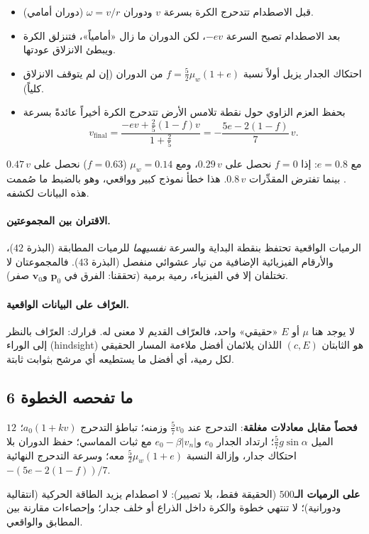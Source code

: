 \documentclass[11pt,a4paper]{article}
\newcommand{\en}[1]{\textenglish{#1}}
\newcommand{\vv}{\bm v}\newcommand{\pp}{\bm p}\newcommand{\uu}{\bm u}
\begin{document}
\begin{example}
\begin{itemize}
\item قبل الاصطدام تتدحرج الكرة بسرعة $v$ ودوران $\omega=v/r$ (دوران أمامي).
\item بعد الاصطدام تصبح السرعة $-ev$، لكن الدوران ما زال «أمامياً»، فتنزلق الكرة ويبطئ الانزلاق عودتها.
\item احتكاك الجدار يزيل أولاً نسبة $f=\frac52\mu_w(1+e)$ من الدوران (إن لم يتوقف الانزلاق كلياً).
\item بحفظ العزم الزاوي حول نقطة تلامس الأرض تتدحرج الكرة أخيراً عائدةً بسرعة
\[ v_{\text{final}}=\frac{-ev+\frac25(1-f)v}{1+\frac25}=-\frac{5e-2(1-f)}{7}\,v. \]
\end{itemize}
مع $e=0.8$: إذا $f=0$ نحصل على $0.29\,v$، ومع $\mu_w=0.14$ ($f=0.63$) نحصل على $0.47\,v$. بينما تفترض المقدِّرات $0.8\,v$.
هذا خطأ نموذج كبير وواقعي، وهو بالضبط ما صُممت هذه البيانات لكشفه.
\end{example}

\paragraph{الاقتران بين المجموعتين.} الرميات الواقعية تحتفظ بنقطة البداية والسرعة \emph{نفسيهما} للرميات المطابقة (البذرة $42$)،
والأرقام الفيزيائية الإضافية من تيار عشوائي منفصل (البذرة $43$). فالمجموعتان لا تختلفان إلا في الفيزياء، رمية برمية
(تحققنا: الفرق في $\pp_0$ و$\vv_0$ صفر).

\paragraph{العرّاف على البيانات الواقعية.} لا يوجد هنا $\mu$ أو $E$ «حقيقي» واحد، فالعرّاف القديم لا معنى له. قرارك: العرّاف
بالنظر إلى الوراء (\en{hindsight}) هو الثابتان $(c,E)$ اللذان يلائمان أفضل ملاءمة المسار الحقيقي لكل رمية، أي أفضل ما يستطيعه
أي مرشح بثوابت ثابتة.

\subsection{ما تفحصه الخطوة 6}
\textbf{$12$ فحصاً مقابل معادلات مغلقة}: التدحرج عند $\frac57v_0$ وزمنه؛ تباطؤ التدحرج $a_0(1+kv)$؛ الميل $\frac57g\sin\alpha$؛
ارتداد الجدار $e_0$ و$e_0-\beta|v_n|$ مع ثبات المماسي؛ حفظ الدوران بلا احتكاك جدار، وإزالة النسبة $\frac52\mu_w(1+e)$ معه؛
وسرعة التدحرج النهائية $-(5e-2(1-f))/7$.

\textbf{على الرميات الـ$500$} (الحقيقة فقط، بلا تصيير): لا اصطدام يزيد الطاقة الحركية (انتقالية ودورانية)؛ لا تنتهي خطوة والكرة
داخل الذراع أو خلف جدار؛ وإحصاءات مقارنة بين المطابق والواقعي.
\end{document}
